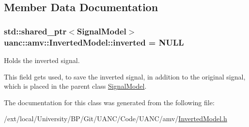 \subsection{Member Data Documentation}
\subsubsection[{\texorpdfstring{inverted}{inverted}}]{\setlength{\rightskip}{0pt plus 5cm}std\+::shared\+\_\+ptr$<${\bf Signal\+Model}$>$ uanc\+::amv\+::\+Inverted\+Model\+::inverted = N\+U\+LL}\hypertarget{classuanc_1_1amv_1_1_inverted_model_a739f026c7b9bd28add6c8b04c4976844}{}\label{classuanc_1_1amv_1_1_inverted_model_a739f026c7b9bd28add6c8b04c4976844}


Holds the inverted signal. 

This field gets used, to save the inverted signal, in addition to the original signal, which is placed in the parent class \hyperlink{classuanc_1_1amv_1_1_signal_model}{Signal\+Model}. 

The documentation for this class was generated from the following file\+:\begin{DoxyCompactItemize}
\item 
/ext/local/\+University/\+B\+P/\+Git/\+U\+A\+N\+C/\+Code/\+U\+A\+N\+C/amv/\hyperlink{_inverted_model_8h}{Inverted\+Model.\+h}\end{DoxyCompactItemize}
